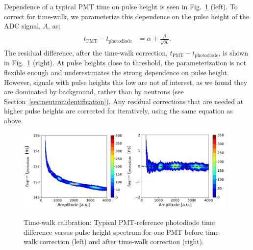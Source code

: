 \documentclass[3p,final,twocolumn]{elsarticle}
\begin{document}
Dependence of a typical PMT time on pulse height is seen in
Fig.~\ref{fig:time_walk} (left). To correct for time-walk, we
parameterize this dependence on the pulse height of the ADC signal, $A$,
as:
\begin{eqnarray}
	\begin{split}
		t_{\mathrm{PMT}}-t_{\mathrm{photodiode}}	&= \alpha + \frac{\beta}{\sqrt{\textrm{A}}}.				
		\label{eqn:time_walk}
	\end{split}
\end{eqnarray}
The residual difference, after the time-walk correction,
$t_{\mathrm{PMT}}-t_{\mathrm{photodiode}}$, is shown in
Fig.~\ref{fig:time_walk} (right). At pulse heights close to threshold,
the parameterization is not flexible enough and underestimates the
strong dependence on pulse height. However, signals with pulse heights
this low are not of interest, as we found they are dominated by background,
rather than by neutrons (see Section~\ref{sec:neutronidentification}). Any residual corrections that are needed at higher pulse heights are corrected for iteratively, using the same equation as above. 

\begin{figure}[tbh]
	\centering
		\includegraphics[width=0.48\textwidth]{timewalkpre.pdf}
		\includegraphics[width=0.48\textwidth]{timewalkpost.pdf}
	\caption{Time-walk calibration: Typical PMT-reference
          photodiode time difference versus pulse height spectrum for one PMT before time-walk correction (left) and after time-walk correction (right).}
	\label{fig:time_walk}
\end{figure}
\end{document}
